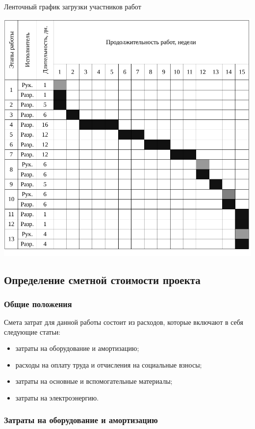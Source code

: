 \begin{table}[!ht]
\caption{Ленточный график загрузки участников работ}
\centering
\includegraphics[page=1, width=1\linewidth]{tables/economics/schedule_2.pdf}
\label{tab:job_is_done_2}
\end{table}


\subsection{Определение сметной стоимости проекта}
\subsubsection{Общие положения}

Смета затрат для данной работы состоит из расходов, которые включают в себя следующие статьи:

\begin{itemize}
\item затраты на оборудование и амортизацию;
\item расходы на оплату труда и отчисления на социальные взносы;
\item затраты на основные и вспомогательные материалы;
\item затраты на электроэнергию.
\end{itemize}
\subsubsection{Затраты на оборудование и амортизацию}

